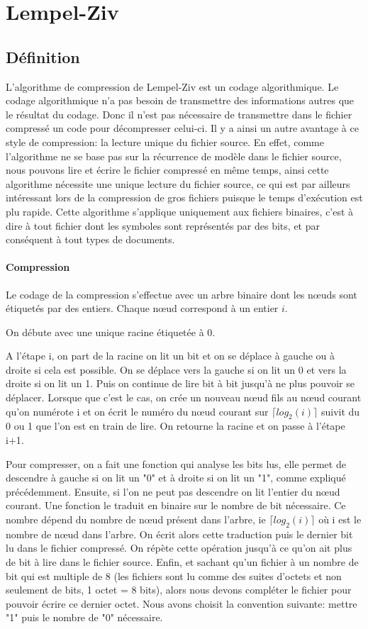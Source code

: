 \documentclass{report}
\begin{document}
\chapter*{Lempel-Ziv}
\section*{Définition }

L'algorithme de compression de Lempel-Ziv est un codage algorithmique.  Le codage algorithmique n’a pas besoin de transmettre des informations autres que le résultat du codage. Donc il n'est pas nécessaire de transmettre dans le fichier compressé un code pour décompresser celui-ci. Il y a ainsi un autre avantage à ce style de compression: la lecture unique du fichier source. En effet, comme l'algorithme ne se base pas sur la récurrence de modèle dans le fichier source, nous pouvons lire et écrire le fichier compressé en même temps, ainsi cette algorithme nécessite une unique lecture du fichier source, ce qui est par ailleurs intéressant lors de la compression de gros fichiers puisque le temps d'exécution est plu rapide. 
Cette algorithme s'applique uniquement aux fichiers binaires, c'est à dire à tout fichier dont les symboles sont représentés par des bits, et par conséquent à tout types de documents. 

\subsubsection{Compression}
Le codage de la compression s'effectue avec un arbre binaire dont les nœuds sont étiquetés par des entiers. Chaque nœud correspond à un entier $i$. 

On débute avec une unique racine étiquetée à 0.

A l'étape i, on part de la racine on lit un bit et on se déplace à gauche ou à droite si cela est possible. On se déplace vers la gauche si on lit un 0 et vers la droite si on lit un 1. Puis on continue de lire bit à bit jusqu'à ne plus pouvoir se déplacer. Lorsque que c'est le cas, on crée un nouveau nœud fils au nœud courant qu'on numérote i et on écrit le numéro du nœud courant sur $\lceil log_{2}(i) \rceil$ suivit du 0 ou 1 que l'on est en train de lire.
On retourne la racine et on passe à l'étape i+1.

Pour compresser, on a fait une fonction qui analyse les bits lus, elle permet de descendre à gauche si on lit un "0" et à droite si on lit un "1", comme expliqué précédemment. Ensuite, si l'on ne peut pas descendre on lit l'entier du nœud courant. Une fonction le traduit en binaire sur le nombre de bit nécessaire. Ce nombre dépend du nombre de nœud présent dans l'arbre, ie $\lceil log_{2}(i) \rceil$ où i est le nombre de nœud dans l'arbre. 
On écrit alors cette traduction puis le dernier bit lu dans le fichier compressé. On répète cette opération jusqu'à ce qu'on ait plus de bit  à lire dans le fichier source.
Enfin, et sachant qu'un fichier à un nombre de bit qui est multiple de 8 (les fichiers sont lu comme des suites d'octets et non seulement de bits, 1 octet = 8 bits), alors nous devons compléter le fichier pour pouvoir écrire ce dernier octet.
Nous avons choisit la convention suivante: mettre "1" puis le nombre de "0" nécessaire. 
\end{document}
